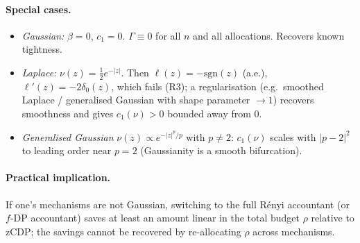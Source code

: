 \documentclass[11pt]{article}
\theoremstyle{definition}
\begin{document}
\paragraph{Special cases.}
\begin{itemize}[leftmargin=*]
\item \emph{Gaussian:} $\beta=0$, $c_1=0$. $\Gamma\equiv 0$ for all $n$ and all allocations. Recovers known tightness.
\item \emph{Laplace:} $\nu(z)=\tfrac12 e^{-|z|}$. Then $\ell(z)=-\mathrm{sgn}(z)$ (a.e.), $\ell'(z)=-2\delta_0(z)$, which fails (R3); a regularisation (e.g.\ smoothed Laplace / generalised Gaussian with shape parameter $\to 1$) recovers smoothness and gives $c_1(\nu)>0$ bounded away from $0$.
\item \emph{Generalised Gaussian} $\nu(z)\propto e^{-|z|^p/p}$ with $p\ne 2$: $c_1(\nu)$ scales with $|p-2|^2$ to leading order near $p=2$ (Gaussianity is a smooth bifurcation).
\end{itemize}

\paragraph{Practical implication.} If one's mechanisms are not Gaussian, switching to the full R\'enyi accountant (or $f$-DP accountant) saves at least an amount linear in the total budget $\rho$ relative to zCDP; the savings cannot be recovered by re-allocating $\rho$ across mechanisms.
\end{document}
